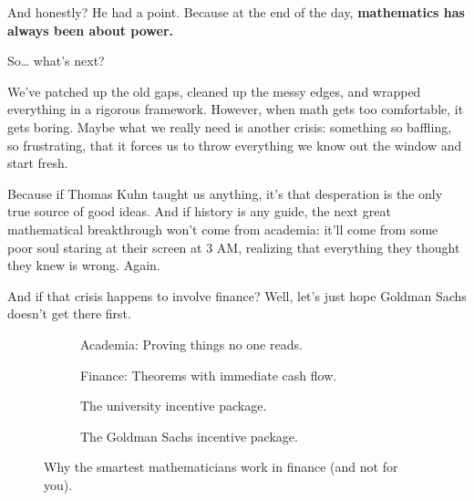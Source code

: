 And honestly? He had a point. Because at the end of the day, \textbf{mathematics has always been about power.}

So… what’s next? 

We’ve patched up the old gaps, cleaned up the messy edges, and wrapped everything in a rigorous framework. However, when math gets too comfortable, it gets boring. Maybe what we really need is another crisis: something so baffling, so frustrating, that it forces us to throw everything we know out the window and start fresh. 

Because if Thomas Kuhn taught us anything, it’s that desperation is the only true source of good ideas. And if history is any guide, the next great mathematical breakthrough won’t come from academia: it’ll come from some poor soul staring at their screen at 3 AM, realizing that everything they thought they knew is wrong. Again. 

And if that crisis happens to involve finance? Well, let’s just hope Goldman Sachs doesn’t get there first. 


\begin{figure}[H]
\centering

\begin{subfigure}[t]{0.45\textwidth}
\centering
{}
\caption*{Academia: Proving things no one reads.}
\end{subfigure}
\hfill
\begin{subfigure}[t]{0.45\textwidth}
\centering
{}
\caption*{Finance: Theorems with immediate cash flow.}
\end{subfigure}

\vspace{1em}

\begin{subfigure}[t]{0.45\textwidth}
\centering
{}
\caption*{The university incentive package.}
\end{subfigure}
\hfill
\begin{subfigure}[t]{0.45\textwidth}
\centering
{}
\caption*{The Goldman Sachs incentive package.}
\end{subfigure}

\caption{Why the smartest mathematicians work in finance (and not for you).}
\end{figure}

